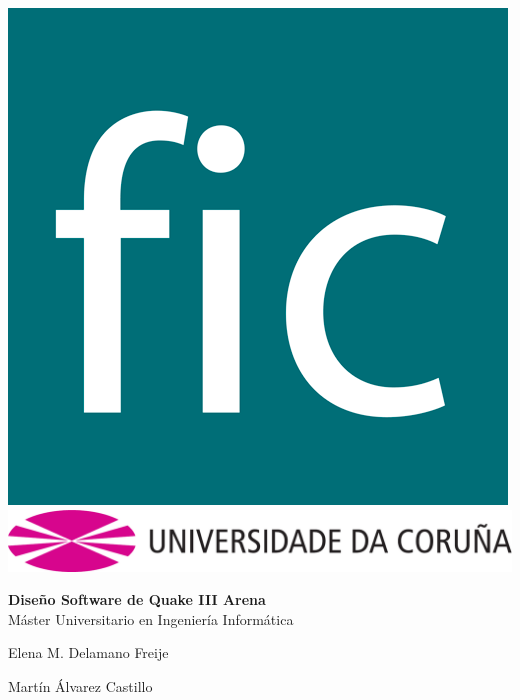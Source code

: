 \documentclass[a4paper,12pt]{report}
\begin{document}
	
	\pagestyle{empty}
	\begin{titlepage}
		\begin{center}
			\includegraphics[scale=0.15]{images/fic01.png} \\ 
			\vspace{2cm} \includegraphics[scale=.4]{images/udc.pdf} \\
			
			
			\vspace{2.5cm}
			
			\textbf{\Large Diseño Software de Quake III Arena}\\
			\vspace{0.5cm}
			\large{Máster Universitario en Ingeniería Informática}\\
		\end{center}
		
		\vspace{7.2cm}
		\begin{flushright}
			\noindent Elena M. Delamano Freije
			
			\noindent Martín Álvarez Castillo
			
		\end{flushright}
	\end{titlepage}
	\clearpage
	
\end{document}
